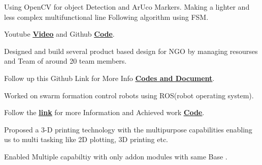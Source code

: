 \documentclass[]{font}
\begin{document}
\begin{minipage}[t]{0.69\textwidth}
\begin{tightemize}

\item Using OpenCV for object Detection and ArUco Markers. Making a lighter and less complex multifunctional line Following algorithm using FSM.
\item Youtube \textbf{\href{https://youtu.be/FhUvQlrLWxc}{\underline{Video}}} and Github \textbf{\href{https://github.com/pranav083/FSM_code}{\underline{Code}}}. 
\end{tightemize}
\sectionsep


\begin{tightemize}
\item Designed and build several product based design for NGO by managing resourses and Team of around 20 team members.
\item Follow up this Github Link for More Info \textbf{\href{https://github.com/pranav083/Tinkering_project}{\underline{Codes and Document}}}.	
\end{tightemize}
\sectionsep
{}
\begin{tightemize}
\item Worked on swarm formation control robots using ROS(robot operating system).
\item Follow the \textbf{\href{http://crip.ml}{\underline{link}}} for more  Information and Achieved work \textbf{\href{https://github.com/pranav083/ROS_work_earlier_nrf}{\underline{Code}}}.	
\end{tightemize}
\sectionsep

\begin{tightemize}
\item Proposed a 3-D printing technology with the multipurpose
capabilities enabling us to multi tasking like 2D plotting, 3D printing etc.
\item Enabled Multiple capabiltiy with only addon modules with same Base .
\end{tightemize}
\sectionsep


\end{minipage}
\end{document}
